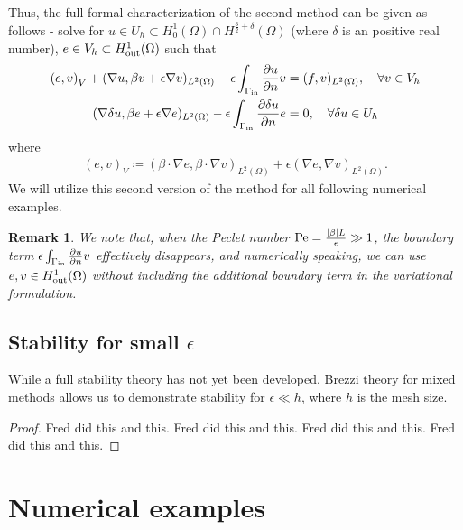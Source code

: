 \documentclass[final,leqno]{siamltex}
\newcommand{\LRp}[1]{\left( #1 \right)}
\newcommand{\LRc}[1]{\left\{ #1 \right\}}
\newcommand{\LRb}[1]{\left| #1 \right|}
\newcommand{\Grad} {\ensuremath{\nabla}}
\renewcommand{\L}{L^2\LRp{\Omega}}
\newcommand{\pd}[2]{\frac{\partial#1}{\partial#2}}
\newtheorem{remark}{Remark}
\begin{document}
Thus, the full formal characterization of the second method can be given as follows - solve for $u\in U_h \subset H^1_0(\Omega)\cap H^{\frac{3}{2}+\delta}(\Omega)$ (where $\delta$ is an positive real number), $e\in V_h\subset H^1_{\rm out}(\Omega)$ such that
\begin{align*}
\LRp{e,v}_V + (\Grad u, \beta v + \epsilon \Grad v)_{\L} - \epsilon\int_{\Gamma_{\rm in}} \pd{u}{n}v &= (f,v)_{\L}, \quad \forall v \in V_h\\
(\Grad \delta u, \beta e + \epsilon \Grad e)_{\L} - \epsilon\int_{\Gamma_{\rm in}} \pd{\delta u}{n}e &= 0, \quad \forall \delta u \in U_h
\end{align*}
where
\begin{align*}
\LRp{e,v}_V \coloneqq \LRp{\beta\cdot \Grad e,\beta\cdot \Grad v}_{\L} + \epsilon \LRp{\Grad e,\Grad v}_{\L}.
\end{align*}
We will utilize this second version of the method for all following numerical examples.  


\begin{remark}
We note that, when the Peclet number ${\rm Pe} = \frac{\LRb{\beta} L}{\epsilon} \gg 1$, the boundary term $\epsilon\int_{\Gamma_{\rm in}} \pd{u}{n}v$ effectively disappears, and numerically speaking, we can use $e,v\in H^1_{\rm out}(\Omega)$ without including the additional boundary term in the variational formulation.  
\end{remark}

\subsection{Stability for small $\epsilon$}
While a full stability theory has not yet been developed, Brezzi theory for mixed methods allows us to demonstrate stability for $\epsilon \ll h$, where $h$ is the mesh size.  
\begin{lemma}

\end{lemma}
\begin{proof}
Fred did this and this.
Fred did this and this.
Fred did this and this.
Fred did this and this.
\end{proof}


\section{Numerical examples}
\end{document}
